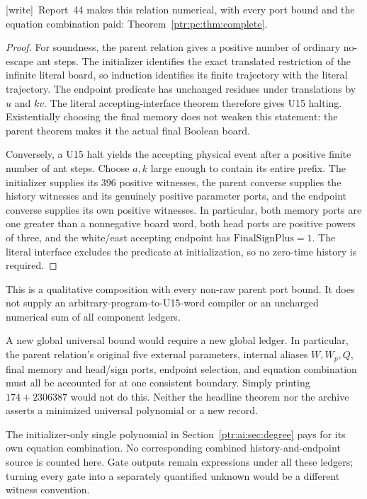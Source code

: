 \documentclass[11pt,letterpaper]{article}
\theoremstyle{definition}\newtheorem{definition}[theorem]{Definition}
\theoremstyle{remark}\newtheorem{remark}[theorem]{Remark}
\newcommand{\wtag}{\textup{[write]}}
\begin{document}
{\small\wtag\ Report~44 makes this relation numerical, with every port bound
and the equation combination paid: Theorem~\ref{ptr:pc:thm:complete}.\par}
\begin{proof}
For soundness, the parent relation gives a positive number of ordinary no-escape ant steps. The initializer identifies the exact translated restriction of the infinite literal board, so induction identifies its finite trajectory with the literal trajectory. The endpoint predicate has unchanged residues under translations by $u$ and $kv$. The literal accepting-interface theorem therefore gives U15 halting. Existentially choosing the final memory does not weaken this statement: the parent theorem makes it the actual final Boolean board.

Conversely, a U15 halt yields the accepting physical event after a positive finite number of ant steps. Choose $a,k$ large enough to contain its entire prefix. The initializer supplies its 396 positive witnesses, the parent converse supplies the history witnesses and its genuinely positive parameter ports, and the endpoint converse supplies its own positive witnesses. In particular, both memory ports are one greater than a nonnegative board word, both head ports are positive powers of three, and the white/east accepting endpoint has $\mathrm{FinalSignPlus}=1$. The literal interface excludes the predicate at initialization, so no zero-time history is required.
\end{proof}
This is a qualitative composition with every non-raw parent port bound. It does not supply an arbitrary-program-to-U15-word compiler or an uncharged numerical sum of all component ledgers.

A new global universal bound would require a new global ledger. In particular, the parent relation's original five external parameters, internal aliases $W,W_p,Q$, final memory and head/sign ports, endpoint selection, and equation combination must all be accounted for at one consistent boundary. Simply printing $174+2306387$ would not do this. Neither the headline theorem nor the archive asserts a minimized universal polynomial or a new record.

The initializer-only single polynomial in Section~\ref{ptr:ai:sec:degree} pays for its own equation combination. No corresponding combined history-and-endpoint source is counted here. Gate outputs remain expressions under all these ledgers; turning every gate into a separately quantified unknown would be a different witness convention.
\end{document}
